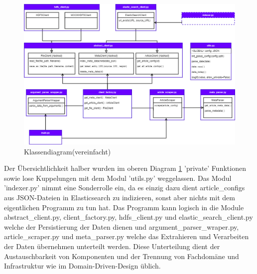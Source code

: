 \documentclass[12pt,oneside,a4paper,parskip]{scrbook}
\begin{document}
\begin{figure}[h!]
\caption{Klassendiagram(vereinfacht)}
\label{articlescraperclassdiag}
\centering
\includegraphics[scale=0.4]{article_scraper_class_diagram.png}
\end{figure}
Der Übersichtlichkeit halber wurden im oberen Diagram \ref{articlescraperclassdiag} 'private' Funktionen sowie lose Kuppelungen mit dem Modul 'utils.py' weggelassen. Das Modul 'indexer.py' nimmt eine Sonderrolle ein, da es einzig dazu dient article\_configs aus JSON-Dateien in Elasticsearch zu indizieren, sonst aber nichts mit dem eigentlichen Programm zu tun hat. Das Programm kann logisch in die Module abstract\_client.py, client\_factory.py, hdfs\_client.py und elastic\_search\_client.py welche der Persistierung der Daten dienen und argument\_parser\_wraper.py, article\_scraper.py und meta\_parser.py welche das Extrahieren und Verarbeiten der Daten übernehmen unterteilt werden. Diese Unterteilung dient der Austauschbarkeit von Komponenten und der Trennung von Fachdomäne und Infrastruktur wie im Domain-Driven-Design üblich.
\pagebreak
\end{document}
